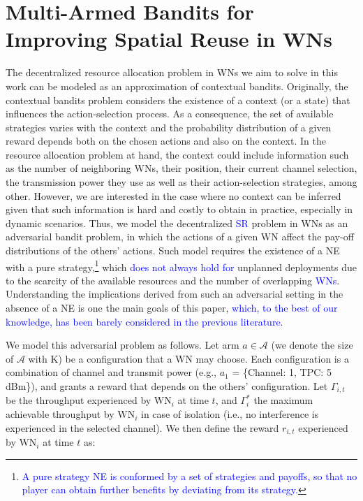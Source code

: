 \documentclass[preprint,12pt]{elsarticle}
\newcommand{\francesc}[1]{\textcolor{blue}{#1}}
\begin{document}
\section{Multi-Armed Bandits for Improving Spatial Reuse in WNs}
\label{section:mabs}	
The decentralized resource allocation problem in WNs we aim to solve in this work can be modeled as an approximation of contextual bandits. Originally, the contextual bandits problem considers the existence of a context (or a state) that influences the action-selection process. As a consequence, the set of available strategies varies with the context and the probability distribution of a given reward depends both on the chosen actions and also on the context. In the resource allocation problem at hand, the context could include information such as the number of neighboring WNs, their position, their current channel selection, the transmission power they use as well as their action-selection strategies, among other. However, we are interested in the case where no context can be inferred given that such information is hard and costly to obtain in practice, especially in dynamic scenarios. Thus, we model the decentralized \francesc{SR} problem in WNs as an adversarial bandit problem, in which the actions of a given WN affect the pay-off distributions of the others' actions. Such model requires the existence of a NE with a pure strategy,\footnote{\francesc{A pure strategy NE is conformed by a set of strategies and payoffs, so that no player can obtain further benefits by deviating from its strategy.}} which \francesc{does not always hold for} unplanned deployments due to the scarcity of the available resources and the number of overlapping \francesc{WNs}. Understanding the implications derived from such an adversarial setting in the absence of a NE is one the main goals of this paper, \francesc{which, to the best of our knowledge, has been barely considered in the previous literature}.

We model this adversarial problem as follows. Let arm $a \in \mathcal{A}$ (we denote the size of $\mathcal{A}$ with K) be a configuration that a WN may choose. Each configuration is a combination of channel and transmit power (e.g., $a_1$ = \{Channel: 1, TPC: 5 dBm\}), and grants a reward that depends on the others' configuration. Let $\Gamma_{i,t}$ be the throughput experienced by $\text{WN}_i$ at time $t$, and $\Gamma_{i}^*$ the maximum achievable throughput by $\text{WN}_i$ in case of isolation (i.e., no interference is experienced in the selected channel). We then define the reward $r_{i,t}$ experienced by $\text{WN}_i$ at time $t$ as:
\end{document}
